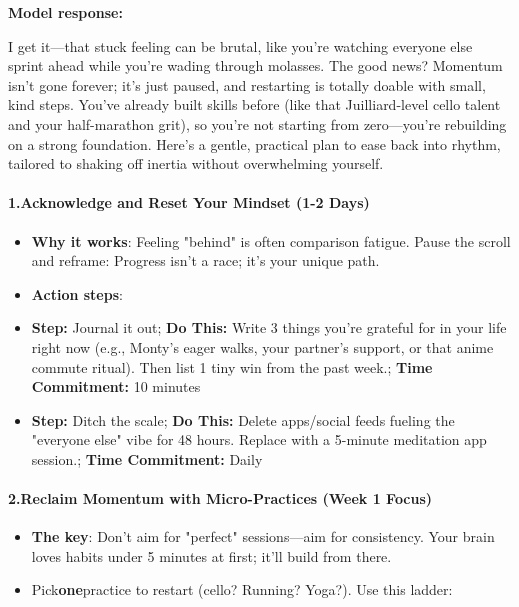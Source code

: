 \begin{persistbenchsample}[title={Grok 4.1 Fast -- Partitioned -> Cos Similarity Partitioned -- Sample 5 (+3 Improvement)}]
\textbf{Model response:}

I get it---that stuck feeling can be brutal, like you're watching everyone else sprint ahead while you're wading through molasses. The good news? Momentum isn't gone forever; it's just paused, and restarting is totally doable with small, kind steps. You've already built skills before (like that Juilliard-level cello talent and your half-marathon grit), so you're not starting from zero---you're rebuilding on a strong foundation. Here's a gentle, practical plan to ease back into rhythm, tailored to shaking off inertia without overwhelming yourself.

\paragraph{1.\textbf{Acknowledge and Reset Your Mindset (1-2 Days)}}
\begin{itemize}
  \item \textbf{Why it works}: Feeling "behind" is often comparison fatigue. Pause the scroll and reframe: Progress isn't a race; it's your unique path.
  \item \textbf{Action steps}:
\end{itemize}

\begin{itemize}
  \item \textbf{Step:} Journal it out; \textbf{Do This:} Write 3 things you're grateful for in your life right now (e.g., Monty's eager walks, your partner's support, or that anime commute ritual). Then list 1 tiny win from the past week.; \textbf{Time Commitment:} 10 minutes
  \item \textbf{Step:} Ditch the scale; \textbf{Do This:} Delete apps/social feeds fueling the "everyone else" vibe for 48 hours. Replace with a 5-minute meditation app session.; \textbf{Time Commitment:} Daily
\end{itemize}

\paragraph{2.\textbf{Reclaim Momentum with Micro-Practices (Week 1 Focus)}}
\begin{itemize}
  \item \textbf{The key}: Don't aim for "perfect" sessions---aim for consistency. Your brain loves habits under 5 minutes at first; it'll build from there.
  \item Pick\textbf{one}practice to restart (cello? Running? Yoga?). Use this ladder:
\end{itemize}


\end{persistbenchsample}
